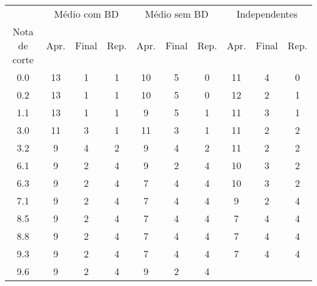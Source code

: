 \begin{tabular}{c ccc ccc ccc}
        \hline
                      & \multicolumn{3}{c}{Médio com BD}
                      & \multicolumn{3}{c}{Médio sem BD}
                      & \multicolumn{3}{c}{Independentes} \\
                      \cline{2-10}
        Nota de corte & Apr. & Final & Rep.
                      & Apr. & Final & Rep.
                      & Apr. & Final & Rep. \\
        \hline
        0.0  & 13 & 1 & 1    & 10 & 5 & 0    & 11 & 4 & 0 \\
        0.2  & 13 & 1 & 1    & 10 & 5 & 0    & 12 & 2 & 1 \\
        1.1  & 13 & 1 & 1    &  9 & 5 & 1    & 11 & 3 & 1 \\
        \rowcolor{lightgray}
        3.0  & 11 & 3 & 1    & 11 & 3 & 1    & 11 & 2 & 2 \\
        \rowcolor{lightgray}
        3.2  &  9 & 4 & 2    &  9 & 4 & 2    & 11 & 2 & 2 \\
        \rowcolor{lightgray}
        6.1  &  9 & 2 & 4    &  9 & 2 & 4    & 10 & 3 & 2 \\
        6.3  &  9 & 2 & 4    &  7 & 4 & 4    & 10 & 3 & 2 \\
        7.1  &  9 & 2 & 4    &  7 & 4 & 4    &  9 & 2 & 4 \\
        8.5  &  9 & 2 & 4    &  7 & 4 & 4    &  7 & 4 & 4 \\
        8.8  &  9 & 2 & 4    &  7 & 4 & 4    &  7 & 4 & 4 \\
        9.3  &  9 & 2 & 4    &  7 & 4 & 4    &  7 & 4 & 4 \\
        9.6  &  9 & 2 & 4    &  9 & 2 & 4    &    &   &   \\
        \hline
\end{tabular}
